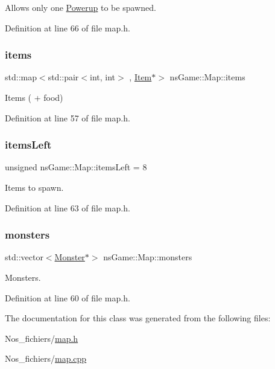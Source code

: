 Allows only one \hyperlink{classns_game_1_1_powerup}{Powerup} to be spawned. 



Definition at line 66 of file map.\+h.

\mbox{\label{classns_game_1_1_map_a8f7fa9511b608d41345adf1f3e3d1b29}} 
\subsubsection{\texorpdfstring{items}{items}}
{\footnotesize\ttfamily std\+::map$<$std\+::pair$<$int, int$>$ , \hyperlink{structns_game_1_1_item}{Item}$\ast$$>$ ns\+Game\+::\+Map\+::items}



Items ( + food) 



Definition at line 57 of file map.\+h.

\mbox{\label{classns_game_1_1_map_addc6c2a156c156ee05b389fa9f500a20}} 
\subsubsection{\texorpdfstring{items\+Left}{itemsLeft}}
{\footnotesize\ttfamily unsigned ns\+Game\+::\+Map\+::items\+Left = 8}



Items to spawn. 



Definition at line 63 of file map.\+h.

\mbox{\label{classns_game_1_1_map_a5c82576202dc341ba011c4cd65f6a60c}} 
\subsubsection{\texorpdfstring{monsters}{monsters}}
{\footnotesize\ttfamily std\+::vector$<$\hyperlink{classns_game_1_1_monster}{Monster}$\ast$$>$ ns\+Game\+::\+Map\+::monsters}



Monsters. 



Definition at line 60 of file map.\+h.



The documentation for this class was generated from the following files\+:\begin{DoxyCompactItemize}
\item 
Nos\+\_\+fichiers/\hyperlink{map_8h}{map.\+h}\item 
Nos\+\_\+fichiers/\hyperlink{map_8cpp}{map.\+cpp}\end{DoxyCompactItemize}
